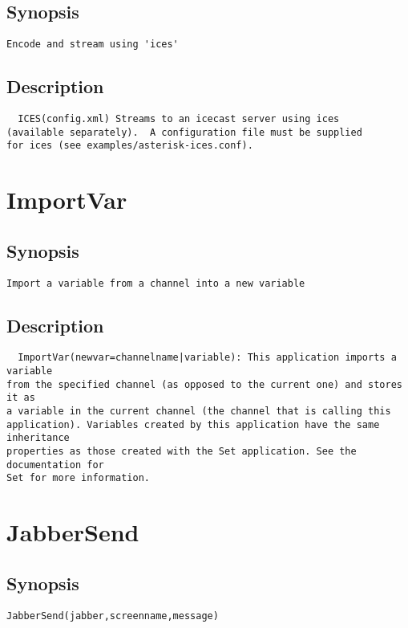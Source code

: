 \subsection{Synopsis}
\begin{verbatim}
Encode and stream using 'ices'
\end{verbatim}
\subsection{Description}
\begin{verbatim}
  ICES(config.xml) Streams to an icecast server using ices
(available separately).  A configuration file must be supplied
for ices (see examples/asterisk-ices.conf). 

\end{verbatim}


\section{ImportVar}
\subsection{Synopsis}
\begin{verbatim}
Import a variable from a channel into a new variable
\end{verbatim}
\subsection{Description}
\begin{verbatim}
  ImportVar(newvar=channelname|variable): This application imports a variable
from the specified channel (as opposed to the current one) and stores it as
a variable in the current channel (the channel that is calling this
application). Variables created by this application have the same inheritance
properties as those created with the Set application. See the documentation for
Set for more information.

\end{verbatim}


\section{JabberSend}
\subsection{Synopsis}
\begin{verbatim}
JabberSend(jabber,screenname,message)
\end{verbatim}
